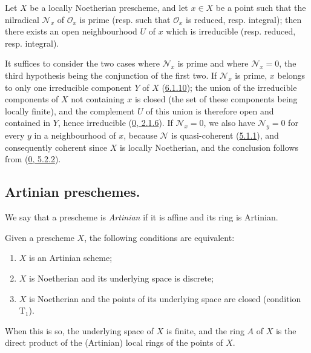 \begin{proposition}[6.1.13]
\label{I.6.1.13}
Let $X$ be a locally Noetherian prescheme, and let $x\in X$ be a point such
that the nilradical $\mathscr{N}_x$ of $\mathscr{O}_x$ is prime (resp. such
that $\mathscr{O}_x$ is reduced, resp. integral); then there exists an open
neighbourhood $U$ of $x$ which is irreducible (resp. reduced, resp.
integral).
\end{proposition}

It suffices to consider the two cases where $\mathscr{N}_x$ is prime and where
$\mathscr{N}_x=0$, the third hypothesis being the conjunction of the first
two. If $\mathscr{N}_x$ is prime, $x$ belongs to only one irreducible
component $Y$ of $X$ (\hyperref[I.6.1.10]{6.1.10}); the union of the
irreducible components of $X$ not containing $x$ is closed
(the set of these components being locally finite), and the complement
$U$ of this union is therefore open and contained in $Y$, hence irreducible
(\hyperref[0.2.1.6]{0, 2.1.6}). If $\mathscr{N}_x=0$, we also have
$\mathscr{N}_y=0$ for every $y$ in a neighbourhood of $x$, because
$\mathscr{N}$ is quasi-coherent (\hyperref[I.5.1.1]{5.1.1}), and
consequently coherent since $X$ is locally Noetherian, and the conclusion
follows from (\hyperref[0.5.2.2]{0, 5.2.2}).

\subsection{Artinian preschemes.}
\label{subsection:I.6.2}

\begin{definition}[6.2.1]
\label{I.6.2.1}
We say that a prescheme is \emph{Artinian} if it is affine and its ring is
Artinian.
\end{definition}

\begin{proposition}[6.2.2]
\label{I.6.2.2}
Given a prescheme $X$, the following conditions are equivalent:
\begin{enumerate}
  \item[a)] $X$ is an Artinian scheme;
  \item[b)] $X$ is Noetherian and its underlying space is discrete;
  \item[c)] $X$ is Noetherian and the points of its underlying space are
    closed (condition $\mathrm{T}_1$).
\end{enumerate}

When this is so, the underlying space of $X$ is finite, and the ring $A$
of $X$ is the direct product of the (Artinian) local rings of the points of
$X$.
\end{proposition}

